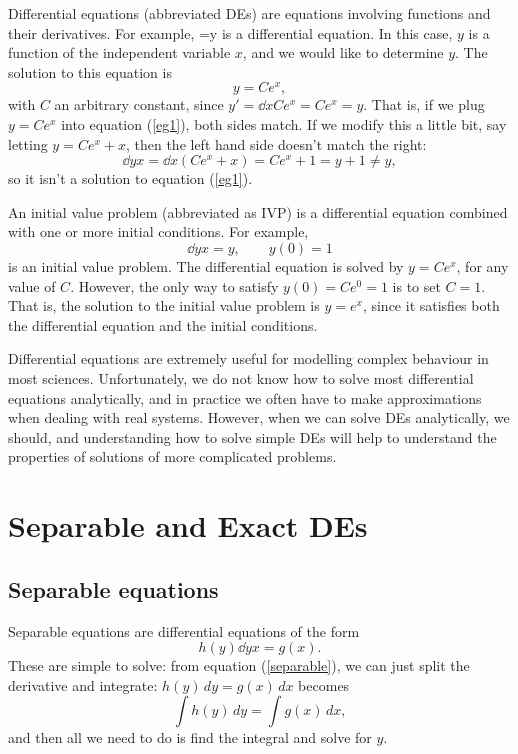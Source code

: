 \documentclass[12pt]{book}
\begin{document}
Differential equations (abbreviated DEs) are equations involving functions and
their derivatives. For example,
\be \label{eg1}
 =y
\ee
is a differential equation. In this case, $y$ is a function of the independent
variable $x$, and we would like to determine $y$. The solution to this
equation is
\begin{dmath*}
  y = Ce^x,
\end{dmath*}
with $C$ an arbitrary constant, since $y'=\dd{}{x}Ce^x=Ce^x=y$. That is, if we
plug $y=Ce^x$ into equation (\ref{eg1}), both sides match. If we modify this
a little bit, say letting $y=Ce^x +x$, then the left hand side doesn't
match the right:
\begin{dmath*}
  \dd{y}{x} = \dd{}{x}(Ce^x +x) 
  = Ce^x + 1 = y +1 
  \neq y,
\end{dmath*}
so it isn't a solution to equation (\ref{eg1}).

An initial value problem (abbreviated as IVP) is a differential equation
combined with one or more initial conditions. For example,
\begin{dmath*}[compact]
  \dd{y}{x}=y, \qquad y(0)=1
\end{dmath*}
is an initial value problem.
The differential equation is solved by $y=Ce^x$, for any value of $C$. However,
the only way to satisfy $y(0)=Ce^0=1$ is to set $C=1$. That is, the solution
to the initial value problem is $y=e^x$, since it satisfies both the
differential equation and the initial conditions.

Differential equations are extremely useful for modelling complex behaviour in
most sciences. Unfortunately, we do not know how to solve most
differential equations analytically, and in practice we often have to
make approximations when dealing with real systems. However, when we can solve
DEs analytically, we should, and understanding how to solve simple DEs will
help to understand the properties of solutions of more complicated problems.



\chapter{Separable and Exact DEs}


\section{Separable equations}

Separable equations are differential equations of the form
\begin{dmath}
  \label{separable}
  \boxed{h(y) \dd{y}{x} = g(x)}.
\end{dmath}
These are simple to solve: from equation (\ref{separable}), we can just split
the derivative and integrate: $ h(y)\, dy = g(x) \, dx$ becomes
\begin{dmath*}
  \boxed{  \int h(y) \, dy = \int g(x) \, dx},
\end{dmath*}
and then all we need to do is find the integral and solve for $y$.\\
\end{document}
